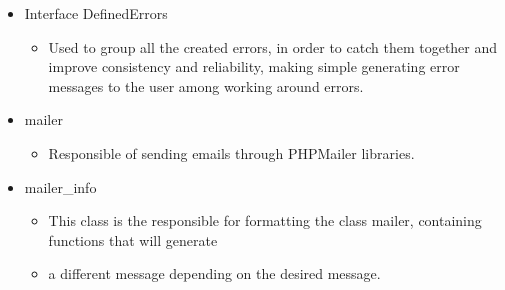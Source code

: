 \begin{flushleft}
\begin{itemize}
    \end{itemize}
    \begin{itemize}
        \item Interface DefinedErrors
        \begin{itemize}
            \item Used to group all the created errors, in order to catch them together and improve consistency and
            reliability, making simple generating error messages to the user among working around errors.
        \end{itemize}
    \end{itemize}
    \begin{itemize}
        \item mailer
        \begin{itemize}
            \item Responsible of sending emails through PHPMailer libraries.
        \end{itemize}
    \end{itemize}
    \begin{itemize}
        \item mailer\_info
        \begin{itemize}
            \item This class is the responsible for formatting the class mailer, containing functions that will generate
            \item a different message depending on the desired message.
        \end{itemize}
    \end{itemize}


\end{flushleft}
